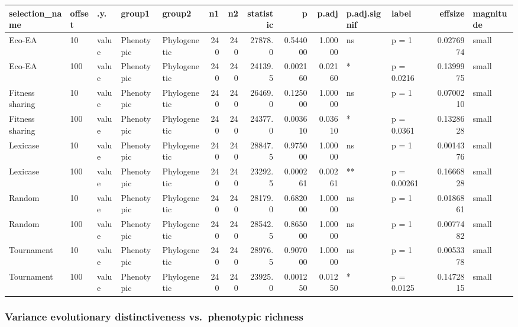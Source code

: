 \documentclass[]{book}
\begin{document}
\begin{table}
\centering
\begin{tabular}[t]{l|l|l|l|l|r|r|r|r|r|l|l|r|l}
\hline
selection\_name & offset & .y. & group1 & group2 & n1 & n2 & statistic & p & p.adj & p.adj.signif & label & effsize & magnitude\\
\hline
Eco-EA & 10 & value & Phenotypic & Phylogenetic & 240 & 240 & 27878.0 & 0.544000 & 1.00000 & ns & p = 1 & 0.0276974 & small\\
\hline
Eco-EA & 100 & value & Phenotypic & Phylogenetic & 240 & 240 & 24139.5 & 0.002160 & 0.02160 & * & p = 0.0216 & 0.1399975 & small\\
\hline
Fitness sharing & 10 & value & Phenotypic & Phylogenetic & 240 & 240 & 26469.0 & 0.125000 & 1.00000 & ns & p = 1 & 0.0700210 & small\\
\hline
Fitness sharing & 100 & value & Phenotypic & Phylogenetic & 240 & 240 & 24377.0 & 0.003610 & 0.03610 & * & p = 0.0361 & 0.1328628 & small\\
\hline
Lexicase & 10 & value & Phenotypic & Phylogenetic & 240 & 240 & 28847.5 & 0.975000 & 1.00000 & ns & p = 1 & 0.0014376 & small\\
\hline
Lexicase & 100 & value & Phenotypic & Phylogenetic & 240 & 240 & 23292.5 & 0.000261 & 0.00261 & ** & p = 0.00261 & 0.1666828 & small\\
\hline
Random & 10 & value & Phenotypic & Phylogenetic & 240 & 240 & 28179.0 & 0.682000 & 1.00000 & ns & p = 1 & 0.0186861 & small\\
\hline
Random & 100 & value & Phenotypic & Phylogenetic & 240 & 240 & 28542.5 & 0.865000 & 1.00000 & ns & p = 1 & 0.0077482 & small\\
\hline
Tournament & 10 & value & Phenotypic & Phylogenetic & 240 & 240 & 28976.5 & 0.907000 & 1.00000 & ns & p = 1 & 0.0053378 & small\\
\hline
Tournament & 100 & value & Phenotypic & Phylogenetic & 240 & 240 & 23925.0 & 0.001250 & 0.01250 & * & p = 0.0125 & 0.1472815 & small\\
\hline
\end{tabular}
\end{table}

\hypertarget{variance-evolutionary-distinctiveness-vs.phenotypic-richness}{%
\subsubsection{Variance evolutionary distinctiveness vs.~phenotypic richness}\label{variance-evolutionary-distinctiveness-vs.phenotypic-richness}}
\end{document}

